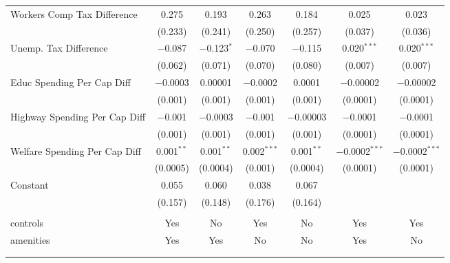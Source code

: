 \begin{table}[!htbp]
\begin{tabular}{@{\extracolsep{5pt}}lcccccc}
  Workers Comp Tax Difference & 0.275 & 0.193 & 0.263 & 0.184 & 0.025 & 0.023 \\ 
  & (0.233) & (0.241) & (0.250) & (0.257) & (0.037) & (0.036) \\ 
  Unemp. Tax Difference & $-$0.087 & $-$0.123$^{*}$ & $-$0.070 & $-$0.115 & 0.020$^{***}$ & 0.020$^{***}$ \\ 
  & (0.062) & (0.071) & (0.070) & (0.080) & (0.007) & (0.007) \\ 
  Educ Spending Per Cap Diff & $-$0.0003 & 0.00001 & $-$0.0002 & 0.0001 & $-$0.00002 & $-$0.00002 \\ 
  & (0.001) & (0.001) & (0.001) & (0.001) & (0.0001) & (0.0001) \\ 
  Highway Spending Per Cap Diff & $-$0.001 & $-$0.0003 & $-$0.001 & $-$0.00003 & $-$0.0001 & $-$0.0001 \\ 
  & (0.001) & (0.001) & (0.001) & (0.001) & (0.0001) & (0.0001) \\ 
  Welfare Spending Per Cap Diff & 0.001$^{**}$ & 0.001$^{**}$ & 0.002$^{***}$ & 0.001$^{**}$ & $-$0.0002$^{***}$ & $-$0.0002$^{***}$ \\ 
  & (0.0005) & (0.0004) & (0.001) & (0.0004) & (0.0001) & (0.0001) \\ 
  Constant & 0.055 & 0.060 & 0.038 & 0.067 &  &  \\ 
  & (0.157) & (0.148) & (0.176) & (0.164) &  &  \\ 
 \hline \\[-1.8ex] 
controls & Yes & No & Yes & No & Yes & Yes \\ 
amenities & Yes & Yes & No & No & Yes & No \\ 
\hline \\[-1.8ex] 
\hline 
\hline \\[-1.8ex] 
\end{tabular} 
\end{table} 
